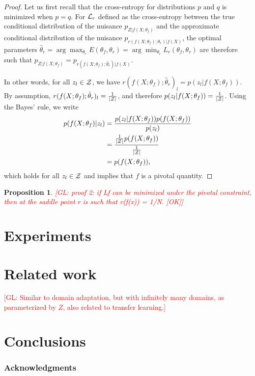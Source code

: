 \documentclass{article}
\newcommand{\glnote}[1]{\textcolor{red}{[GL: #1]}}
\theoremstyle{plain}
\newtheorem{proposition}[theorem]{Proposition}
\begin{document}
\begin{proof}

Let us first recall that the cross-entropy for distributions $p$ and $q$ is
minimized when $p=q$. For ${\cal L}_r$ defined as the cross-entropy between the
true conditional distribution of the nuisance $p_{Z|f(X;\theta_f)}$ and
the approximate conditional distribution of the nuisance
$p_{r(f(X;\theta_f);\theta_r)|f(X)}$, the optimal parameters $\hat\theta_r =
\arg \max_{\theta_r} E(\theta_f, \theta_r) = \arg \min_{\theta_r} L_r(\theta_f,
\theta_r)$ are therefore such that $p_{Z|f(X;\theta_f)} =
p_{r(f(X;\theta_f);\hat\theta_r)|f(X)}$.

In other words, for all $z_l \in {\cal Z}$, we have $r(f(X;\theta_f);\hat\theta_r)_l = p(z_l|f(X;\theta_f))$.
By assumption, $r(f(X;\theta_f);\hat\theta_r)_l = \frac{1}{|{\cal Z}|}$,
and therefore $p(z_l|f(X;\theta_f)) = \frac{1}{|{\cal Z}|}$.
Using the Bayes' rule, we write
\begin{align*}
    p(f(X;\theta_f)|z_l) &= \frac{ p(z_l|f(X;\theta_f)) p(f(X;\theta_f)) } { p(z_l)} \\
                         &= \frac{ \tfrac{1}{|{\cal Z}|} p(f(X;\theta_f)) } { \tfrac{1}{|{\cal Z}|} } \\
                         &= p(f(X;\theta_f)),
\end{align*}
which holds for all $z_l \in {\cal Z}$ and implies that $f$ is a pivotal quantity.
\end{proof}

\begin{proposition}
\glnote{proof 2: if Lf can be minimized under the pivotal constraint, then at the saddle point r is such that r(f(x)) = 1/N. [OK]}
\end{proposition}




\section{Experiments}

\section{Related work}

\glnote{Similar to domain adaptation, but with infinitely many domains,
as parameterized by $Z$, also related to transfer learning.}

\section{Conclusions}

\subsubsection*{Acknowledgments}


{\small
}
\end{document}
